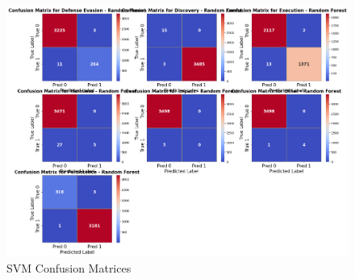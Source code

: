         \clearpage
    
        
        \begin{figure}[H]
        
            \centering
            
            \begin{minipage}{\textwidth}
                \centering
                \begin{minipage}[c]{0.8\textwidth}
                    \centering
                    \includegraphics[width=\textwidth]{../figures/plots/section2/Random_Forest_base_evaluation.png}
                    \caption{SVM Confusion Matrices}
                    \label{fig:}
                \end{minipage}%
            \end{minipage}

            \vspace{0.5cm}  %
            

\end{figure}
